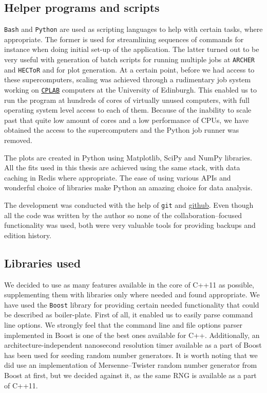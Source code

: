 \documentclass[11pt,a4paper]{article}
\begin{document}
\begin{appendices}
    \subsection{Helper programs and scripts}
    \texttt{Bash} and \texttt{Python} are used as scripting languages to help with certain tasks, where appropriate.
    The former is used for streamlining sequences of commands for instance when doing initial set-up of the application.
    The latter turned out to be very useful with generation of batch scripts for running multiple jobs at \texttt{ARCHER} and \texttt{HECToR} and for plot generation.
    At a certain point, before we had access to these supercomputers, scaling was achieved through a rudimentary job system working on \texttt{\href{http://www2.ph.ed.ac.uk/~wjh/faq/}{CPLAB}} computers at the University of Edinburgh.
    This enabled us to run the program at hundreds of cores of virtually unused computers, with full operating system level access to each of them.
    Because of the inability to scale past that quite low amount of cores and a low performance of CPUs, we have obtained the access to the supercomputers and the Python job runner was removed.

    The plots are created in Python using Matplotlib, SciPy and NumPy libraries.
    All the fits used in this thesis are achieved using the same stack, with data caching in Redis where appropriate.
    The ease of using various APIs and wonderful choice of libraries make Python an amazing choice for data analysis.

    The development was conducted with the help of \texttt{git} and \href{https://github.com/mkawalec/masters}{github}.
    Even though all the code was written by the author so none of the collaboration--focused functionality was used, both were very valuable tools for providing backups and edition history.

    \subsection{Libraries used}
    We decided to use as many features available in the core of C++11 as possible, supplementing them with libraries only where needed and found appropriate.
    We have used the \texttt{Boost}\cite{gurtovoy02} library for providing certain needed functionality that could be described as boiler-plate.
    First of all, it enabled us to easily parse command line options.
    We strongly feel that the command line and file options parser implemented in Boost is one of the best ones available for C++.
    Additionally, an architecture-independent nanosecond resolution timer available as a part of Boost has been used for seeding random number generators.
    It is worth noting that we did use an implementation of Mersenne--Twister\cite{Matsumoto98} random number generator from Boost at first, but we decided against it, as the same RNG is available as a part of C++11.


\end{appendices}
\end{document}
